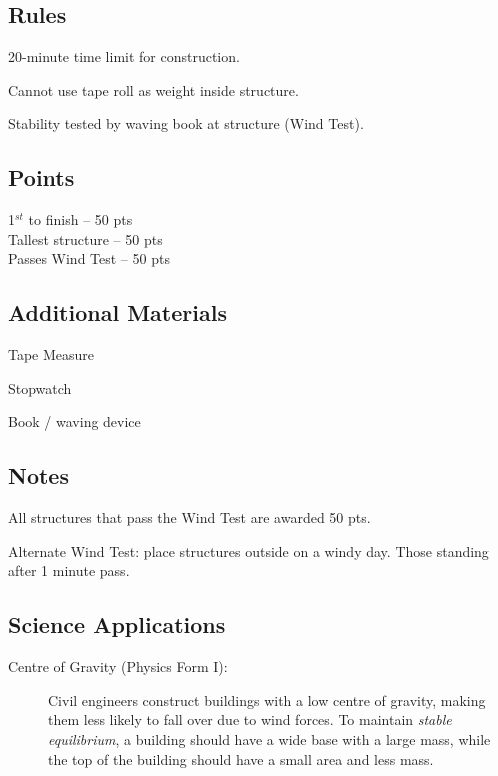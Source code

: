 \subsection{Rules}
\begin{itemize*}
\item 20-minute time limit for construction.
\item Cannot use tape roll as weight inside structure.
\item Stability tested by waving book at structure (Wind Test).
\end{itemize*}

\subsection{Points}
1$^{st}$ to finish – 50 pts\\
Tallest structure – 50 pts\\
Passes Wind Test – 50 pts

\subsection{Additional Materials}
\begin{itemize*}
\item Tape Measure
\item Stopwatch
\item Book / waving device
\end{itemize*}

\subsection{Notes}
\begin{itemize*}
\item All structures that pass the Wind Test are awarded 50 pts.
\item Alternate Wind Test: place structures outside on a windy day. Those standing after 1 minute pass.
\end{itemize*}

\subsection{Science Applications}
\begin{description}
\item[Centre of Gravity (Physics Form I):]{Civil engineers construct buildings with a low centre of gravity, making them less likely to fall over due to wind forces. To maintain \emph{stable equilibrium}, a building should have a wide base with a large mass, while the top of the building should have a small area and less mass.}
\end{description}

